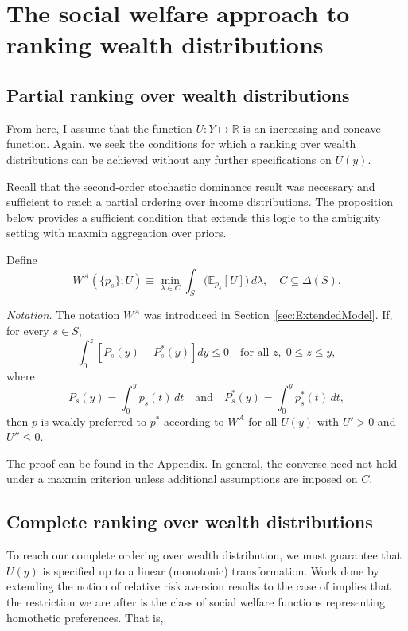 \documentclass[../../../00-main.tex]{subfiles}
\begin{document}
\section{The social welfare approach to ranking wealth distributions}
\label{sec:SWFapproach}

\subsection{Partial ranking over wealth distributions}

\par From here, I assume that the function $U: Y \mapsto \mathbb{R}$ is an increasing and concave function. Again, we seek the conditions for which a ranking over wealth distributions can be achieved without any further specifications on $U(y)$.

\par Recall that the second-order stochastic dominance result was necessary and sufficient to reach a partial ordering over income distributions. The proposition below provides a sufficient condition that extends this logic to the ambiguity setting with maxmin aggregation over priors.

\begin{prop}
Define
\[
W^{A}(\{p_s\};U) \equiv \min_{\lambda \in C} \int_{S} \big(\mathbb{E}_{p_s}[U]\big)\, d\lambda,
\quad C \subseteq \Delta(S).
\]
\par \textit{Notation.} The notation $W^{A}$ was introduced in Section~\ref{sec:ExtendedModel}.
If, for every $s \in S$,
\[
\int_{0}^{z} \left[P_{s}(y) - P^{*}_{s}(y)\right] dy \leq 0
\quad \text{for all } z,\; 0 \leq z \leq \bar{y},
\]
where
\[
P_s(y) = \int_{0}^{y} p_s(t)\,dt
\quad \text{and} \quad
P_s^*(y) = \int_{0}^{y} p_s^*(t)\,dt,
\]
then $p$ is weakly preferred to $p^*$ according to $W^{A}$ for all $U(y)$ with $U' > 0$ and $U'' \leq 0$.
\end{prop}


\par The proof can be found in the Appendix. In general, the converse need not hold under a maxmin criterion unless additional assumptions are imposed on $C$.

\subsection{Complete ranking over wealth distributions}

\par To reach our complete ordering over wealth distribution, we must guarantee that $U(y)$ is specified up to a linear (monotonic) transformation. Work done by \cite{rklm81} extending the notion of relative risk aversion results to the case of  implies that the restriction we are after is the class of social welfare functions representing homothetic preferences. That is,
\end{document}

